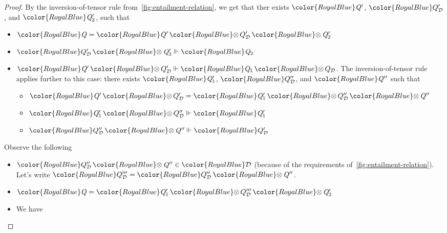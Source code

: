 \documentclass[acmsmall,usenames,dvipsnames,natbib=false,acmthm=false,screen]{acmart}
\newcommand{\constraintcolour}{\color{RoyalBlue}}
\newcommand{\constraintfont}[1]{{\constraintcolour#1}}
\newcommand{\constraintop}[1]{\mathop{\constraintfont{#1}}}
\newcommand{\qtensor}{\constraintop{\otimes}}
\theoremstyle{acmplain}
\theoremstyle{acmdefinition}
\begin{document}
\begin{proof}
  By the inversion-of-tensor rule from~\cref{fig:entailment-relation},
  we get that ther exists $  \constraintfont{ \ottnt{Q'} }  $, $  \constraintfont{ Q_{\mathcal{D} }' }  $, and $  \constraintfont{ \ottnt{Q'_{{\mathrm{2}}}} }  $,
  such that
  \begin{itemize}
  \item $  \constraintfont{ \ottnt{Q} }   =   \constraintfont{ \ottnt{Q'}  \qtensor  Q_{\mathcal{D} }'  \qtensor  \ottnt{Q'_{{\mathrm{2}}}} }  $
  \item $ \constraintfont{ Q_{\mathcal{D} }'  \qtensor  \ottnt{Q'_{{\mathrm{2}}}} }   \Vdash   \constraintfont{ \ottnt{Q_{{\mathrm{2}}}} } $
  \item $ \constraintfont{ \ottnt{Q'}  \qtensor  Q_{\mathcal{D} }' }   \Vdash   \constraintfont{ \ottnt{Q_{{\mathrm{1}}}}  \qtensor  Q_{\mathcal{D} } } $. The inversion-of-tensor rule
    applies further to this case: there exists $  \constraintfont{ \ottnt{Q'_{{\mathrm{1}}}} }  $,
    $  \constraintfont{ Q_{\mathcal{D} }'' }  $, and $  \constraintfont{ \ottnt{Q''} }  $ such that
    \begin{itemize}
    \item $  \constraintfont{ \ottnt{Q'}  \qtensor  Q_{\mathcal{D} }' }   =   \constraintfont{ \ottnt{Q'_{{\mathrm{1}}}}  \qtensor  Q_{\mathcal{D} }''  \qtensor  \ottnt{Q''} }  $
    \item $ \constraintfont{ \ottnt{Q'_{{\mathrm{1}}}}  \qtensor  Q_{\mathcal{D} }'' }   \Vdash   \constraintfont{ \ottnt{Q'_{{\mathrm{1}}}} } $
    \item $ \constraintfont{ Q_{\mathcal{D} }''  \qtensor  \ottnt{Q''} }   \Vdash   \constraintfont{ Q_{\mathcal{D} }' } $
    \end{itemize}
  \end{itemize}
  Observe the following
  \begin{itemize}
  \item $  \constraintfont{ Q_{\mathcal{D} }''  \qtensor  \ottnt{Q''} }   \in  \constraintfont{\mathcal{D} } $ (because of the requirements
    of~\cref{fig:entailment-relation}). Let's write
    $  \constraintfont{ Q_{\mathcal{D} }''' }   =   \constraintfont{ Q_{\mathcal{D} }''  \qtensor  \ottnt{Q''} }  $.
  \item $  \constraintfont{ \ottnt{Q} }   =   \constraintfont{ \ottnt{Q'_{{\mathrm{1}}}}  \qtensor  Q_{\mathcal{D} }'''  \qtensor  \ottnt{Q'_{{\mathrm{2}}}} }  $
  \item We have
    \begin{itemize}

\end{itemize}
\end{itemize}
\end{proof}
\end{document}
